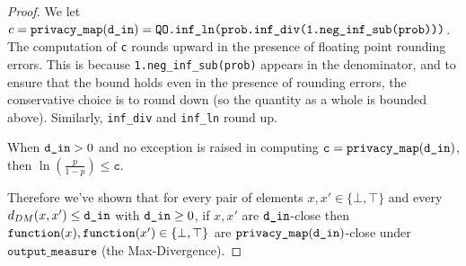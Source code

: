 \documentclass{article}
\begin{document}
\begin{proof}
We let $c = \texttt{privacy\_map}(\texttt{d\_in}) = \texttt{QO.inf\_ln(prob.inf\_div(1.neg\_inf\_sub(prob)))}$.
The computation of \texttt{c} rounds upward in the presence of floating point rounding errors.
This is because \texttt{1.neg\_inf\_sub(prob)} appears in the denominator, and to ensure that the bound holds even in the presence of rounding errors, the conservative choice is to round down (so the quantity as a whole is bounded above).
Similarly, \texttt{inf\_div} and \texttt{inf\_ln} round up.

When $\texttt{d\_in} > 0$ and no exception is raised in computing $\texttt{c} = \texttt{privacy\_map}(\texttt{d\_in})$, then $\ln\left(\frac{p}{1 - p}\right) \leq \texttt{c}$.

Therefore we've shown that for every pair of elements $x, x' \in \{\bot, \top\}$ and every $d_{DM}(x, x') \le \texttt{d\_in}$ with $\texttt{d\_in} \ge 0$,
if $x, x'$ are $\texttt{d\_in}$-close then $\texttt{function}(x),\texttt{function}(x') \in \{\bot, \top\}$ are $\texttt{privacy\_map}(\texttt{d\_in})$-close under $\texttt{output\_measure}$ (the Max-Divergence).
\end{proof}




\end{document}
